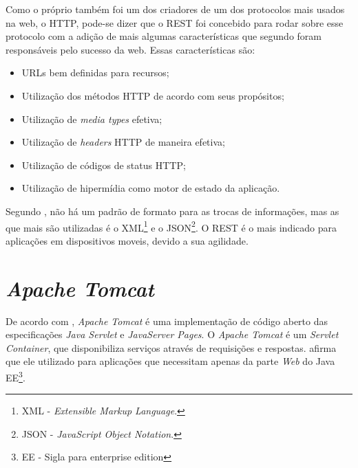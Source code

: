 			\par Como o próprio  também foi um dos criadores de um
		dos protocolos mais usados na web, o HTTP, pode-se dizer que o REST foi
		concebido para rodar sobre esse protocolo com a adição de mais algumas
		características que segundo  foram responsáveis pelo
		sucesso da web. Essas características são:
		
			\begin{itemize}
			  
			  \item URLs bem definidas para recursos;
			  
			  \item Utilização dos métodos HTTP de acordo com seus propósitos;
			  
			  \item Utilização de \textit{media types} efetiva;
			  
			  \item Utilização de \textit{headers} HTTP de maneira efetiva;
			  
			  \item Utilização de códigos de status HTTP;
			  
			  \item Utilização de hipermídia como motor de estado da aplicação.
			
			\end{itemize}
			 
			\par Segundo , não há um padrão de formato para as
		 trocas de informações, mas as que mais são utilizadas é o XML\footnote{XML
		 - \textit{Extensible Markup Language}.} e o JSON\footnote{JSON - 
		 \textit{JavaScript Object Notation}.}. O REST é o mais indicado para aplicações
		 em dispositivos moveis, devido a sua agilidade.
	
	
\section{\textit{Apache Tomcat}}

	\par De acordo com , \textit{Apache Tomcat} é uma
implementação de código aberto das especificações \textit{Java Servlet} e
\textit{JavaServer Pages}. O \textit{Apache Tomcat} é um \textit{Servlet
Container}, que disponibiliza serviços através de requisições e respostas.
 afirma que ele utilizado para aplicações que necessitam
apenas da parte \textit{Web} do Java EE\footnote{EE - Sigla para enterprise
edition}.

